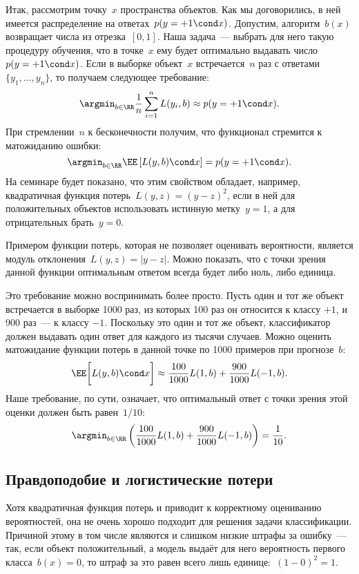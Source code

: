 \documentclass[12pt,fleqn]{article}
\begin{document}
Итак, рассмотрим точку~$x$ пространства объектов.
Как мы договорились, в ней имеется распределение на ответах~$p(y = +1 \cond x)$.
Допустим, алгоритм~$b(x)$ возвращает числа из отрезка~$[0, 1]$.
Наша задача~--- выбрать для него такую процедуру обучения, что в точке~$x$
ему будет оптимально выдавать число~$p(y = +1 \cond x)$.
Если в выборке объект~$x$ встречается~$n$ раз с ответами~$\{y_1, \dots, y_n\}$,
то получаем следующее требование:
\[
    \argmin_{b \in \RR}
    \frac{1}{n}
    \sum_{i = 1}^{n}
        L(y_i, b)
    \approx
    p(y = +1 \cond x).
\]
При стремлении~$n$ к бесконечности получим, что функционал стремится к матожиданию ошибки:
\[
    \argmin_{b \in \RR}
    \EE \left[
        L(y, b)
        \cond
        x
    \right]
    =
    p(y = +1 \cond x).
\]
На семинаре будет показано, что этим свойством обладает, например, квадратичная функция потерь~$L(y, z) = (y - z)^2$,
если в ней для положительных объектов использовать истинную метку~$y = 1$, а для отрицательных брать~$y = 0$.

Примером функции потерь, которая не позволяет оценивать вероятности, является модуль отклонения~$L(y, z) = |y - z|$.
Можно показать, что с точки зрения данной функции оптимальным ответом всегда будет либо ноль, либо единица.

Это требование можно воспринимать более просто.
Пусть один и тот же объект встречается в выборке 1000 раз,
из которых 100 раз он относится к классу $+1$, и 900 раз~--- к классу $-1$.
Поскольку это один и тот же объект, классификатор должен выдавать один ответ
для каждого из тысячи случаев.
Можно оценить матожидание функции потерь в данной точке по 1000 примеров при прогнозе~$b$:
\[
    \EE \biggl[
        L(y, b)
        \cond
        x
    \biggr]
    \approx
    \frac{100}{1000}
    L(1, b)
    +
    \frac{900}{1000}
    L(-1, b).
\]
Наше требование, по сути, означает, что оптимальный ответ
с точки зрения этой оценки должен быть равен~$1/10$:
\[
    \argmin_{b \in \RR} \left(
        \frac{100}{1000} L(1, b)
        +
        \frac{900}{1000} L(-1, b)
    \right)
    =
    \frac{1}{10}.
\]

\subsection{Правдоподобие и логистические потери}
Хотя квадратичная функция потерь и приводит к корректному оцениванию вероятностей,
она не очень хорошо подходит для решения задачи классификации.
Причиной этому в том числе являются и слишком низкие штрафы за ошибку~---
так, если объект положительный, а модель выдаёт для него вероятность первого класса~$b(x) = 0$,
то штраф за это равен всего лишь единице:~$(1 - 0)^2 = 1$.
\end{document}
